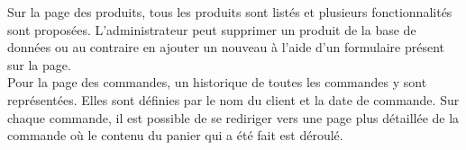 Sur la page des produits, tous les produits sont listés et plusieurs
fonctionnalités sont proposées. L'administrateur peut supprimer un produit de
la base de données ou au contraire en ajouter un nouveau à l'aide d'un
formulaire présent sur la page. \\

Pour la page des commandes, un historique de toutes les commandes y sont
représentées. Elles sont définies par le nom du client et la date de commande.
Sur chaque commande, il est possible de se rediriger vers une page plus
détaillée de la commande où le contenu du panier qui a été fait est déroulé.
